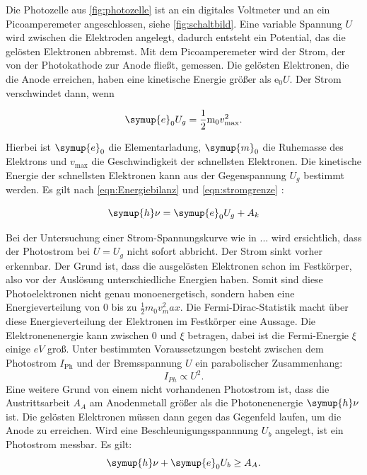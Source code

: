 Die Photozelle aus \autoref{fig:photozelle} ist an ein digitales Voltmeter und an ein Picoamperemeter angeschlossen, siehe \autoref{fig:schaltbild}.
Eine variable Spannung $U$ wird zwischen die Elektroden angelegt, dadurch entsteht ein Potential, das die gelösten Elektronen abbremst.
Mit dem Picoamperemeter wird der Strom, der von der Photokathode zur Anode fließt, gemessen.
Die gelösten Elektronen, die die Anode erreichen, haben eine kinetische Energie größer als $\text{e}_0 U$.
Der Strom verschwindet dann, wenn 

\begin{equation}
    \symup{e}_0 U_g = \frac{1}{2} \text{m}_0 v^2_\text{max}.
    \label{eqn:stromgrenze}
\end{equation}

Hierbei ist $\symup{e}_0$ die Elementarladung, $\symup{m}_0$ die Ruhemasse des Elektrons und $v_\text{max}$ die Geschwindigkeit der schnellsten Elektronen.
Die kinetische Energie der schnellsten Elektronen kann aus der Gegenspannung $U_g$ bestimmt werden.
Es gilt nach \autoref{eqn:Energiebilanz} und \autoref{eqn:stromgrenze} :

\begin{equation}
    \symup{h} \nu = \symup{e}_0 U_g + A_k
\end{equation}

Bei der Untersuchung einer Strom-Spannungskurve wie in ... wird ersichtlich, dass der Photostrom bei $U = U_g$ nicht sofort abbricht.
Der Strom sinkt vorher erkennbar.
Der Grund ist, dass die ausgelösten Elektronen schon im Festkörper, also vor der Auslösung unterschiedliche Energien haben.
Somit sind diese Photoelektronen nicht genau monoenergetisch, sondern haben eine Energieverteilung von 0 bis zu $\frac{1}{2} m_0 v^2_max$.
Die Fermi-Dirac-Statistik macht über diese Energieverteilung der Elektronen im Festkörper eine Aussage.
Die Elektronenenergie kann zwischen 0 und $\xi$  betragen, dabei ist die Fermi-Energie $\xi$ einige $eV$ groß.
Unter bestimmten Voraussetzungen besteht zwischen dem Photostrom $I_\text{Ph}$ und der Bremsspannung $U$ ein parabolischer Zusammenhang:
\begin{equation*}
    I_{Ph} \propto U^2.
\end{equation*}
Eine weitere Grund von einem nicht vorhandenen Photostrom ist, dass die Austrittsarbeit $A_A$ am Anodenmetall größer als die Photonenenergie $\symup{h} \nu$ ist.
Die gelösten Elektronen müssen dann gegen das Gegenfeld laufen, um die Anode zu erreichen.
Wird eine Beschleunigungsspannnung $U_b$ angelegt, ist ein Photostrom messbar.
Es gilt:
\begin{equation}
    \symup{h} \nu + \symup{e}_0 U_b \geq A_A.
\end{equation}